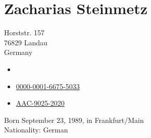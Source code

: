 
\reversemarginpar
\fancyhfoffset[RO]{0mm}

\chapter[Curriculum Vitae]{Zacharias Steinmetz}

	\begin{cv}


	\vspace{.5em}

	\noindent
	\begin{minipage}{0.5\linewidth}
		Horststr. 157\\
		76829 Landau\\
		Germany
	\end{minipage}
	\begin{minipage}{0.5\linewidth}
		\begin{itemize}[left=.65em, noitemsep]
			\item[\color{InfRd}\envelope] 
			\item[\href{https://orcid.org/0000-0001-6675-5033}{\orcid}]
			\href{https://orcid.org/0000-0001-6675-5033}{0000-0001-6675-5033}
			\item[\href{https://publons.com/researcher/AAC-9025-2020/}{\publons}]
			\href{https://publons.com/researcher/AAC-9025-2020/}{AAC-9025-2020}
		\end{itemize}
	\end{minipage}

	\vspace{1em}
	\noindent Born September 23, 1989, in Frankfurt/Main \\
	\noindent Nationality: German

	\vspace{2em} %






\end{cv}
